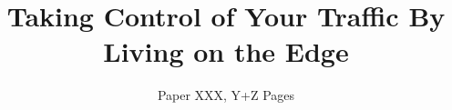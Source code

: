 \documentclass[letterpaper,twocolumn,10pt]{article}
\begin{document}
\setlength{\droptitle}{-1.5cm}

\title{\LARGE Taking Control of Your Traffic By Living on the Edge}
\author{Paper XXX, Y+Z Pages}

\date{\vspace{-12mm}}

\maketitle

\begin{sloppypar}










\end{sloppypar}
\label{p:end}
\clearpage


\end{document}
